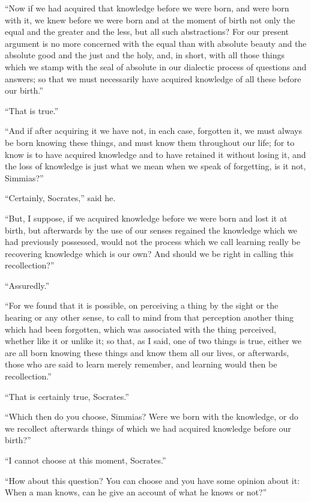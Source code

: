 \documentclass[letterpaper,12pt]{article}
\newcommand{\stephpag}[1]{\marginnote{\small\itshape\fontfamily{ppl}\selectfont #1}}
\begin{document}
\begin{drama}
``Now if we had acquired that knowledge before we were born, and were born with it, we knew before we were born and at the moment of birth not only the equal and the greater and the less, but all such abstractions? For our present argument is no more concerned with the equal than with absolute beauty and the absolute good and the just and the holy, and, in short, \stephpag{d} with all those things which we stamp with the seal of absolute in our dialectic process of questions and answers; so that we must necessarily have acquired knowledge of all these before our birth.''
 
``That is true.''
 
``And if after acquiring it we have not, in each case, forgotten it, we must always be born knowing these things, and must know them throughout our life; for to know is to have acquired knowledge and to have retained it without losing it, and the loss of knowledge is just what we mean when we speak of forgetting, is it not, Simmias?''
 
``Certainly, \stephpag{e} Socrates,'' said he.
 
``But, I suppose, if we acquired knowledge before we were born and lost it at birth, but afterwards by the use of our senses regained the knowledge which we had previously possessed, would not the process which we call learning really be recovering knowledge which is our own? And should we be right in calling this recollection?''
 
``Assuredly.''
 
``For we found that it is possible, \stephpag{76 a} on perceiving a thing by the sight or the hearing or any other sense, to call to mind from that perception another thing which had been forgotten, which was associated with the thing perceived, whether like it or unlike it; so that, as I said, one of two things is true, either we are all born knowing these things and know them all our lives, or afterwards, those who are said to learn merely remember, and learning would then be recollection.''
 
``That is certainly true, Socrates.''
 
``Which then do you choose, Simmias? Were we born \stephpag{b} with the knowledge, or do we recollect afterwards things of which we had acquired knowledge before our birth?''
 
``I cannot choose at this moment, Socrates.''
 
``How about this question? You can choose and you have some opinion about it: When a man knows, can he give an account of what he knows or not?''
 

\end{drama}
\end{document}
